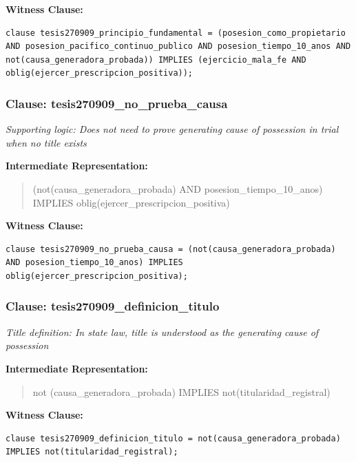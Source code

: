 \documentclass[11pt,a4paper]{article}
\begin{document}
\textbf{Witness Clause:}

\begin{lstlisting}[style=witnessstyle, language=Witness]
clause tesis270909_principio_fundamental = (posesion_como_propietario AND posesion_pacifico_continuo_publico AND posesion_tiempo_10_anos AND not(causa_generadora_probada)) IMPLIES (ejercicio_mala_fe AND oblig(ejercer_prescripcion_positiva));
\end{lstlisting}

\subsubsection{Clause: tesis270909\_no\_prueba\_causa}

\textit{Supporting logic: Does not need to prove generating cause of possession in trial when no title exists}

\textbf{Intermediate Representation:}

\begin{quote}
(not(causa\_generadora\_probada) AND posesion\_tiempo\_10\_anos) IMPLIES oblig(ejercer\_prescripcion\_positiva)
\end{quote}

\textbf{Witness Clause:}

\begin{lstlisting}[style=witnessstyle, language=Witness]
clause tesis270909_no_prueba_causa = (not(causa_generadora_probada) AND posesion_tiempo_10_anos) IMPLIES oblig(ejercer_prescripcion_positiva);
\end{lstlisting}

\subsubsection{Clause: tesis270909\_definicion\_titulo}

\textit{Title definition: In state law, title is understood as the generating cause of possession}

\textbf{Intermediate Representation:}

\begin{quote}
not (causa\_generadora\_probada) IMPLIES not(titularidad\_registral)
\end{quote}

\textbf{Witness Clause:}

\begin{lstlisting}[style=witnessstyle, language=Witness]
clause tesis270909_definicion_titulo = not(causa_generadora_probada) IMPLIES not(titularidad_registral);
\end{lstlisting}
\end{document}
